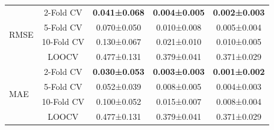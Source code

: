 \begin{table}[H]
\begin{tabular}{lcccc}
        \midrule
        \multirow{4}{*}{RMSE}
            & 2-Fold CV
                & \textbf{0.041±0.068}
                & \textbf{0.004±0.005}
                & \textbf{0.002±0.003} \\
            & 5-Fold CV
                & 0.070±0.050
                & 0.010±0.008
                & 0.005±0.004 \\
            & 10-Fold CV
                & 0.130±0.067
                & 0.021±0.010
                & 0.010±0.005 \\
            & LOOCV
                & 0.477±0.131
                & 0.379±0.041
                & 0.371±0.029 \\         
        \midrule
        \multirow{4}{*}{MAE}
            & 2-Fold CV
                & \textbf{0.030±0.053}
                & \textbf{0.003±0.003}
                & \textbf{0.001±0.002} \\
            & 5-Fold CV
                & 0.052±0.039
                & 0.008±0.005
                & 0.004±0.003 \\
            & 10-Fold CV
                & 0.100±0.052
                & 0.015±0.007
                & 0.008±0.004 \\
            & LOOCV
                & 0.477±0.131
                & 0.379±0.041
                & 0.371±0.029 \\
        \bottomrule
    \end{tabular}
    \label{tab:eval_var}
\end{table}
